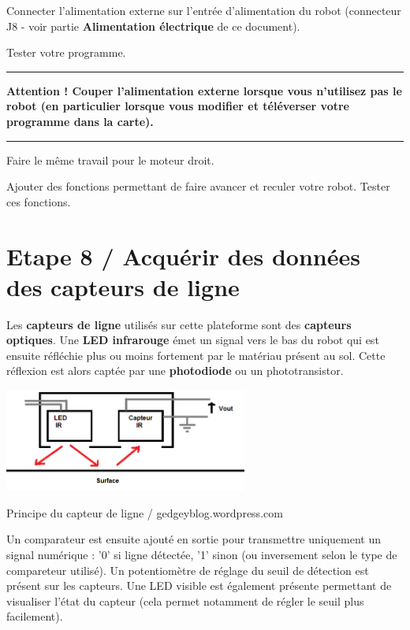 \documentclass[a4paper,11pt,titlepage]{article} %
\begin{document}
\Manip Connecter l'alimentation externe sur l'entrée d'alimentation du robot (connecteur J8 - voir partie \textbf{Alimentation électrique} de ce document).

\Manip Tester votre programme.


\noindent \rule{\linewidth}{1pt}

\textbf{Attention ! Couper l'alimentation externe lorsque vous n'utilisez pas le robot (en particulier lorsque vous modifier et téléverser votre programme dans la carte).}

\noindent \rule{\linewidth}{1pt}

\medskip

\Manip Faire le même travail pour le moteur droit.

\Manip Ajouter des fonctions permettant de faire avancer et reculer votre robot. Tester ces fonctions.


\newpage
\section{Etape 8 / Acquérir des données des capteurs de ligne}

Les \textbf{capteurs de ligne} utilisés sur cette plateforme sont des \textbf{capteurs optiques}. Une \textbf{LED infrarouge} émet un signal vers le bas du robot qui est ensuite réfléchie plus ou moins fortement par le matériau présent au sol. Cette réflexion est alors captée par une \textbf{photodiode} ou un phototransistor.

\begin{center}
	\includegraphics[width=0.6\textwidth]{images/capteur_ligne_gedgayblog.png}
	
	Principe du capteur de ligne / gedgeyblog.wordpress.com
\end{center}

Un comparateur est ensuite ajouté en sortie pour transmettre uniquement un signal numérique : '0' si ligne détectée, '1' sinon (ou inversement selon le type de compareteur utilisé). Un potentiomètre de réglage du seuil de détection est présent sur les capteurs. Une LED visible est également présente permettant de visualiser l'état du capteur (cela permet notamment de régler le seuil plus facilement).
\end{document}
